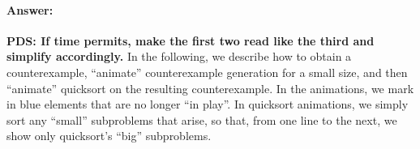 \documentclass[a4paper]{article}
\newcommand*{\dave}[1]{{\color{red}\textbf{PDS: #1}}}
\begin{document}
\paragraph{Answer:}%
\dave{%
	If time permits, make the first two read like the third and simplify accordingly.
}
\newcommand*{\USED}[1]{{\color{blue}#1}}%
\newcommand{\HOLE}{{\rule[-.2ex]{1ex}{.4pt}}}%
\newcommand{\SWAP}{\leftrightarrow}%
\newcommand*{\argmedian}{\operatorname{argmedian}}%
\newcommand*{\set}[1]{\{#1\}}%
In the following, we describe how to obtain a counterexample, ``animate'' counterexample generation for a small size, and then ``animate'' quicksort on the resulting counterexample.
In the animations, we \USED{mark in blue} elements that are no longer ``in play''.
In quicksort animations, we simply sort any ``small'' subproblems that arise, so that, from one line to the next, we show only quicksort's ``big'' subproblems.
\end{document}
